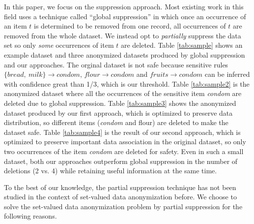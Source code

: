 



In this paper, we focus on the suppression approach.
Most existing work in this field uses a technique called ``global
suppression'' \cite{Cao:2010:rho} in which once an occurrence of an item $t$ is
determined to be removed from one record, all occurrences of $t$ are
removed from the whole dataset. We instead opt to {\em partially}
suppress the data set so only {\em some} occurrences of item $t$ are
deleted.
Table \ref{tab:sample} shows an example dataset
and three anonymized datasets produced by global suppression and our approaches.
The orginal dataset is not safe because sensitive rules $\{bread,~milk\} \rightarrow condom$, 
$flour \rightarrow condom$ and $fruits \rightarrow condom$ can be
inferred with confidence great than 1/3, which is our threshold.
Table \ref{tab:sample2} is the anonymized dataset where all the occurrences of
the sensitive item {\em condom} are deleted due to global suppression.
Table \ref{tab:sample3} shows the anonymized dataset produced by our first
approach, which is optimized to preserve data distribution, so different
items ({\em condom} and flour) are deleted to make the dataset safe.
Table \ref{tab:sample4} is the result of our second approach, which is optimized
to preserve important data association in the original dataset, so only
two occurrences of the item {\em condom} are deleted for safety.
Even in such a small dataset, both our approaches outperform global suppression
in the number of deletions (2 vs. 4) while retaining useful information at the same time.

To the best of our knowledge, the partial suppression technique
has not been studied in the context of set-valued data anonymization before.
We choose to solve the set-valued data anonymization problem by partial
suppression for the following reasons.


